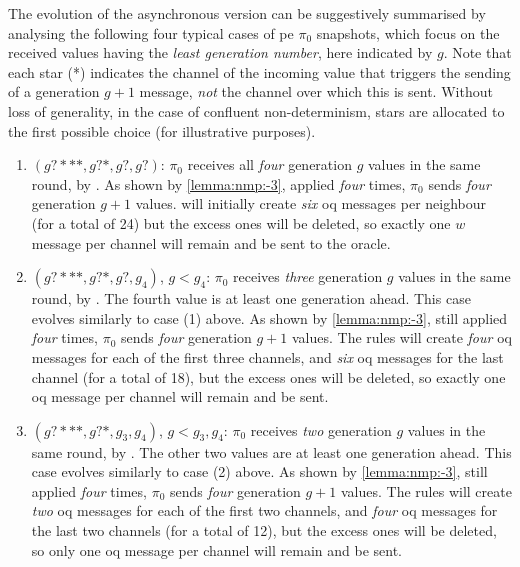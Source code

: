 \begin{remark}\label{remark:nmp:-2}
    The evolution of the asynchronous version can be suggestively summarised by
    analysing the following four typical cases of \gls{pe} $\pi_0$ snapshots,
    which focus on the received values having the \emph{least generation number}, here indicated by $g$.
    Note that each star (*) indicates the channel of the incoming value 
    that triggers the sending of a generation $g+1$ message, 
    \emph{not} the channel over which this is sent.
    Without loss of generality, in the case of confluent non-determinism,
    stars are allocated to the first possible choice (for illustrative purposes).
    
    \begin{enumerate}
    \item $(g?***, g?*, g?, g?)$: 
    $\pi_0$ receives all \emph{four} generation $g$ values in the same round, by . 
    As shown by \cref{lemma:nmp:-3}, applied \emph{four} times, 
    $\pi_0$ sends \emph{four} generation $g+1$ values.
     will initially create \emph{six} \gls{oq} messages per neighbour (for a total of 24)
    but the excess ones will be deleted, so exactly one \(w\) message per channel will remain and be sent to the oracle.
    
    \medskip
    \item $(g?***, g?*, g?, g_4)$, $g < g_4$: 
    $\pi_0$ receives \emph{three} generation $g$ values in the same round, by .
    The fourth value is at least one generation ahead.    
    This case evolves similarly to case (1) above.
    As shown by \cref{lemma:nmp:-3}, still applied \emph{four} times, 
    $\pi_0$ sends \emph{four} generation $g+1$ values.
    The rules will create \emph{four} \gls{oq} messages for each of the first three channels,
    and \emph{six} \gls{oq} messages for the last channel (for a total of 18),
    but the excess ones will be deleted, so exactly one \gls{oq} message per channel will remain and be sent.
    
    \medskip
    \item $(g?***, g?*, g_3, g_4)$, $g < g_3, g_4$: 
    $\pi_0$ receives \emph{two} generation $g$ values in the same round, by .
    The other two values are at least one generation ahead.    
    This case evolves similarly to case (2) above.
    As shown by \cref{lemma:nmp:-3}, still applied \emph{four} times, 
    $\pi_0$ sends \emph{four} generation $g+1$ values.
    The rules will create \emph{two} \gls{oq} messages for each of the first two channels,
    and \emph{four} \gls{oq} messages for the last two channels (for a total of 12),
    but the excess ones will be deleted, so only one \gls{oq} message per channel will remain and be sent.
    

\end{enumerate}
\end{remark}
